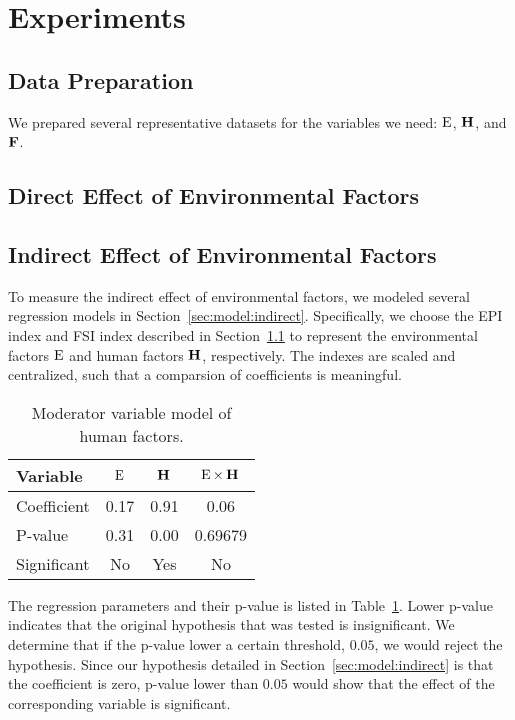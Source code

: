 \section{Experiments}
\label{sec:exp}
\subsection{Data Preparation}
\label{sec:exp:prep}
We prepared several representative datasets for the variables we need: $\operatorname*{E}$, $\operatorname*{\mathbf{H}}$, and $\operatorname*{\mathbf{F}}$.

\subsection{Direct Effect of Environmental Factors}
\label{sec:exp:direct}

\subsection{Indirect Effect of Environmental Factors}
\label{sec:exp:indirect}
To measure the indirect effect of environmental factors, we modeled several regression models in Section~\ref{sec:model:indirect}. Specifically, we choose the EPI index and FSI index described in Section~\ref{sec:exp:prep} to represent the environmental factors $\operatorname*{E}$ and human factors $\operatorname*{\mathbf{H}}$, respectively. The indexes are scaled and centralized, such that a comparsion of coefficients is meaningful.
\begin{table}[htbp]
    \centering
   \begin{tabular}{|l|ccc|} \hline
      Variable & $\operatorname*{E}$ & $\operatorname*{\mathbf{H}}$ & $\operatorname*{E}\times\operatorname*{\mathbf{H}}$ \\ \hline
      Coefficient & 0.17 & 0.91 & 0.06 \\ \hline
      P-value & 0.31 & 0.00 & 0.69679 \\ \hline
      Significant & No & Yes & No  \\ \hline
   \end{tabular} 
   \caption{Moderator variable model of human factors.}
   \label{tab:exp:moderator}
\end{table}

The regression parameters and their p-value is listed in Table~\ref{tab:exp:moderator}. Lower p-value indicates that the original hypothesis that was tested is insignificant. We determine that if the p-value lower a certain threshold, $0.05$, we would reject the hypothesis. Since our hypothesis detailed in Section~\ref{sec:model:indirect} is that the coefficient is zero, p-value lower than $0.05$ would show that the effect of the corresponding variable is significant.


